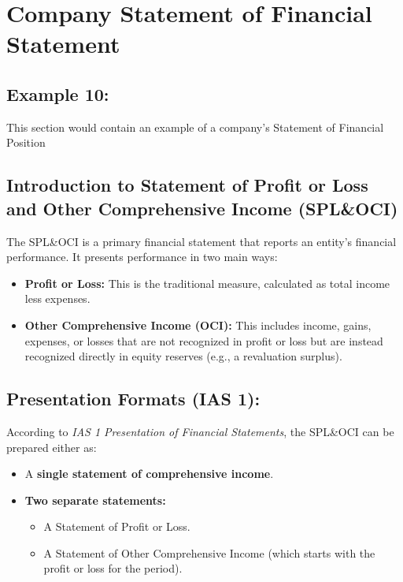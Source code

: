 \section{Company Statement of Financial Statement}

\subsection*{Example 10:}
This section would contain an example of a company's Statement of Financial Position

\subsection{Introduction to Statement of Profit or Loss and Other Comprehensive Income (SPL\&OCI)}

The SPL\&OCI is a primary financial statement that reports an entity's financial performance. It presents performance in two main ways:

\begin{itemize}
    \item \textbf{Profit or Loss:} This is the traditional measure, calculated as total income less expenses.
    \item \textbf{Other Comprehensive Income (OCI):} This includes income, gains, expenses, or losses that are not recognized in profit or loss but are instead recognized directly in equity reserves (e.g., a revaluation surplus).
\end{itemize}

\subsection*{Presentation Formats (IAS 1):}
According to \textit{IAS 1 Presentation of Financial Statements}, the SPL\&OCI can be prepared either as:

\begin{itemize}
    \item A \textbf{single statement of comprehensive income}.
    \item \textbf{Two separate statements:}
    \begin{itemize}
        \item A Statement of Profit or Loss.
        \item A Statement of Other Comprehensive Income (which starts with the profit or loss for the period).
    \end{itemize}
\end{itemize}

